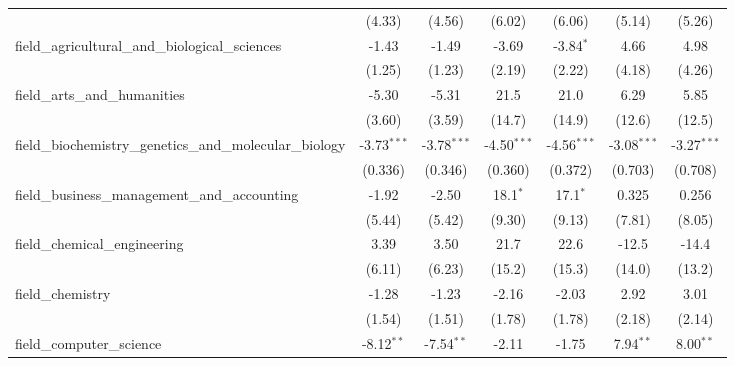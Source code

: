 \begin{tabular}{lcccccc}
                                                               & (4.33)         & (4.56)         & (6.02)        & (6.06)        & (5.14)        & (5.26)\\   
   field\_agricultural\_and\_biological\_sciences              & -1.43          & -1.49          & -3.69         & -3.84$^{*}$   & 4.66          & 4.98\\   
                                                               & (1.25)         & (1.23)         & (2.19)        & (2.22)        & (4.18)        & (4.26)\\   
   field\_arts\_and\_humanities                                & -5.30          & -5.31          & 21.5          & 21.0          & 6.29          & 5.85\\   
                                                               & (3.60)         & (3.59)         & (14.7)        & (14.9)        & (12.6)        & (12.5)\\   
   field\_biochemistry\_genetics\_and\_molecular\_biology      & -3.73$^{***}$  & -3.78$^{***}$  & -4.50$^{***}$ & -4.56$^{***}$ & -3.08$^{***}$ & -3.27$^{***}$\\   
                                                               & (0.336)        & (0.346)        & (0.360)       & (0.372)       & (0.703)       & (0.708)\\   
   field\_business\_management\_and\_accounting                & -1.92          & -2.50          & 18.1$^{*}$    & 17.1$^{*}$    & 0.325         & 0.256\\   
                                                               & (5.44)         & (5.42)         & (9.30)        & (9.13)        & (7.81)        & (8.05)\\   
   field\_chemical\_engineering                                & 3.39           & 3.50           & 21.7          & 22.6          & -12.5         & -14.4\\   
                                                               & (6.11)         & (6.23)         & (15.2)        & (15.3)        & (14.0)        & (13.2)\\   
   field\_chemistry                                            & -1.28          & -1.23          & -2.16         & -2.03         & 2.92          & 3.01\\   
                                                               & (1.54)         & (1.51)         & (1.78)        & (1.78)        & (2.18)        & (2.14)\\   
   field\_computer\_science                                    & -8.12$^{**}$   & -7.54$^{**}$   & -2.11         & -1.75         & 7.94$^{**}$   & 8.00$^{**}$\\   

\end{tabular}
